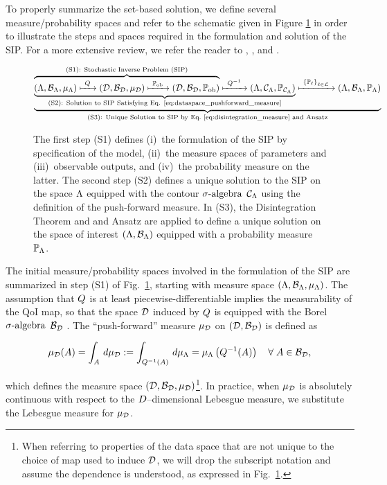 To properly summarize the set-based solution, we define several measure/probability spaces and refer to the schematic given in Figure \ref{fig:scheme} in order to illustrate the steps and spaces required in the formulation and solution of the SIP.
For a more extensive review, we refer the reader to \cite{BBE11}, \cite{BES12}, and \cite{BET+14}.

\begin{figure}[!h]
\begin{equation}
\underbrace{
\underbrace{
\overbrace{
 ({\Lambda}, \mathcal{B}_{{\Lambda}}, \mu_{{\Lambda}}) \xmapsto{\  Q\ } (\mathcal{D}, \mathcal{B}_{\mathcal{D}}, \mu_{\mathcal{D}})
  \xmapsto{\ \operatorname*{\mathbb{P}_{ob}}\ } (\mathcal{D}, \mathcal{B}_{\mathcal{D}}, \operatorname*{\mathbb{P}_{ob}})
 }^{
 \text{(S1): Stochastic Inverse Problem (SIP)}
 }
 \xmapsto{\ Q^{-1} \ } ({\Lambda}, \mathcal{C}_{{\Lambda}}, \operatorname*{\mathbb{P}_{\mathcal{C}_{{\Lambda}}}})
 }_{
 \text{(S2): Solution to SIP Satisfying Eq. \eqref{eq:dataspace_pushforward_measure}}}
 \xmapsto{\ \left\{\mathbb{P}_\ell\right\}_{\ell\in\mathcal{L}} \ } ({\Lambda}, \mathcal{B}_{{\Lambda}}, \mathbb{P}_{\Lambda})
 }
 _{
 \text{(S3): Unique Solution to SIP by Eq.~\eqref{eq:disintegration_measure} and Ansatz}
 }
\end{equation}
\caption{The first step (S1) defines (i)~the formulation of the SIP by specification of the model, (ii)~the measure spaces of parameters and (iii)~observable outputs, and (iv)~the probability measure on the latter. The second step (S2) defines a unique solution to the SIP on the space ${\Lambda}$ equipped with the contour $\sigma\text{-algebra}$ $\mathcal{C}_{{\Lambda}}$ using the definition of the push-forward measure. In (S3), the Disintegration Theorem and and Ansatz are applied to define a unique solution on the space of interest $({\Lambda}, \mathcal{B}_{{\Lambda}})$ equipped with a probability measure $\mathbb{P}_{\Lambda}$.}
\label{fig:scheme}
\end{figure}


The initial measure/probability spaces involved in the formulation of the SIP are summarized in step (S1) of Fig.~\ref{fig:scheme}, starting with measure space $({\Lambda}, \mathcal{B}_{{\Lambda}}, \mu_{{\Lambda}})$.
The assumption that $Q$ is at least piecewise-differentiable implies the measurability of the QoI map, so that the space $\mathcal{D}$ induced by $Q$ is equipped with the Borel $\sigma\text{-algebra}$ $\mathcal{B}_{\mathcal{D}}$ \cite{Hunter}.
The ``push-forward'' measure $\mu_{\mathcal{D}}$ on ${(\mathcal{D}, \mathcal{B}_{\mathcal{D}})}$ is defined as

\begin{equation}\label{eq:dataspace_pushforward_measure}
\mu_{\mathcal{D}} (A) = \int_A \, d\mu_{\mathcal{D}} := \int_{Q^{-1}(A)} \, d\mu_{{\Lambda}} = \mu_{{\Lambda}} \left (Q^{-1}(A) \right ) \quad \forall \;  A\in\mathcal{B}_{\mathcal{D}},
\end{equation}

\noindent which defines the measure space $(\mathcal{D}, \mathcal{B}_{\mathcal{D}}, \mu_{\mathcal{D}})$\footnote{When referring to properties of the data space that are not unique to the choice of map used to induce $\mathcal{D}$, we will drop the subscript notation and assume the dependence is understood, as expressed in Fig.~\ref{fig:scheme}.}.
In practice, when $\mu_{\mathcal{D}}$ is absolutely continuous with respect to the $D$--dimensional Lebesgue measure, we substitute the Lebesgue measure for $\mu_{\mathcal{D}}$.

